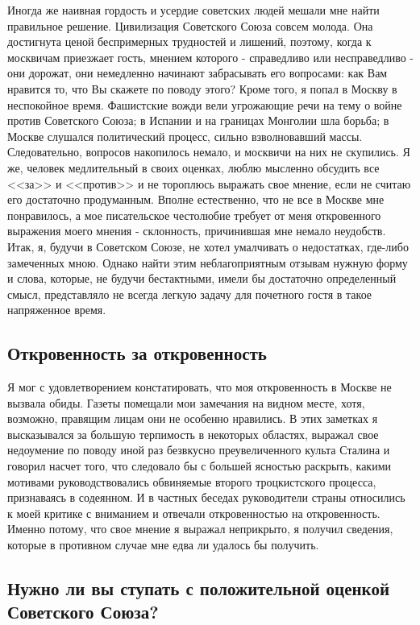 \documentclass[12pt, a4paper, openany]{book}
\begin{document}
Иногда же наивная гордость и усердие советских людей мешали мне найти правильное решение. Цивилизация Советского Союза совсем молода. Она достигнута ценой беспримерных трудностей и лишений, поэтому, когда к москвичам приезжает гость, мнением которого - справедливо или несправедливо - они дорожат, они немедленно начинают забрасывать его вопросами: как Вам нравится то, что Вы скажете по поводу этого? Кроме того, я попал в Москву в неспокойное время. Фашистские вожди вели угрожающие речи на тему о войне против Советского Союза; в Испании и на границах Монголии шла борьба; в Москве слушался политический процесс, сильно взволновавший массы. Следовательно, вопросов накопилось немало, и москвичи на них не скупились. Я же, человек медлительный в своих оценках, люблю мысленно обсудить все <<за>> и <<против>> и не тороплюсь выражать свое мнение, если не считаю его достаточно продуманным. Вполне естественно, что не все в Москве мне понравилось, а мое писательское честолюбие требует от меня откровенного выражения моего мнения - склонность, причинившая мне немало неудобств. Итак, я, будучи в Советском Союзе, не хотел умалчивать о недостатках, где-либо замеченных мною. Однако найти этим неблагоприятным отзывам нужную форму и слова, которые, не будучи бестактными, имели бы достаточно определенный смысл, представляло не всегда легкую задачу для почетного гостя в такое напряженное время.

\subsection*{Откровенность за откровенность}

Я мог с удовлетворением констатировать, что моя откровенность в Москве не вызвала обиды. Газеты помещали мои замечания на видном месте, хотя, возможно, правящим лицам они не особенно нравились. В этих заметках я высказывался за большую терпимость в некоторых областях, выражал свое недоумение по поводу иной раз безвкусно преувеличенного культа Сталина и говорил насчет того, что следовало бы с большей ясностью раскрыть, какими мотивами руководствовались обвиняемые второго троцкистского процесса, признаваясь в содеянном. И в частных беседах руководители страны относились к моей критике с вниманием и отвечали откровенностью на откровенность. Именно потому, что свое мнение я выражал неприкрыто, я получил сведения, которые в противном случае мне едва ли удалось бы получить.

\subsection*{Нужно ли вы ступать с положительной оценкой Советского Союза?}
\end{document}
